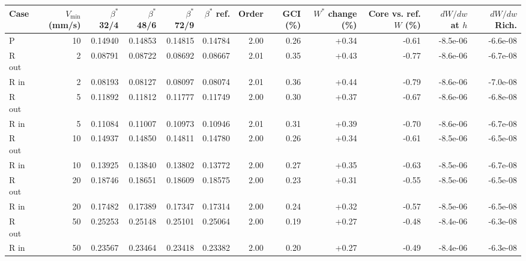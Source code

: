 \begin{tabular}{lrrrrrrrrrrr}
\toprule
Case & $V_\mathrm{min}$ (mm/s) & $\beta^*$ 32/4 & $\beta^*$ 48/6 & $\beta^*$ 72/9 & $\beta^*$ ref. & Order & GCI (\%) & $W^*$ change (\%) & Core vs. ref. $W$ (\%) & $dW/dw$ at $h$ & $dW/dw$ Rich. \\
\midrule
P & 10 & 0.14940 & 0.14853 & 0.14815 & 0.14784 & 2.00 & 0.26 & +0.34 & -0.61 & -8.5e-06 & -6.6e-08 \\
R out & 2 & 0.08791 & 0.08722 & 0.08692 & 0.08667 & 2.01 & 0.35 & +0.43 & -0.77 & -8.6e-06 & -6.7e-08 \\
R in & 2 & 0.08193 & 0.08127 & 0.08097 & 0.08074 & 2.01 & 0.36 & +0.44 & -0.79 & -8.6e-06 & -7.0e-08 \\
R out & 5 & 0.11892 & 0.11812 & 0.11777 & 0.11749 & 2.00 & 0.30 & +0.37 & -0.67 & -8.6e-06 & -6.8e-08 \\
R in & 5 & 0.11084 & 0.11007 & 0.10973 & 0.10946 & 2.01 & 0.31 & +0.39 & -0.70 & -8.6e-06 & -6.7e-08 \\
R out & 10 & 0.14937 & 0.14850 & 0.14811 & 0.14780 & 2.00 & 0.26 & +0.34 & -0.61 & -8.5e-06 & -6.5e-08 \\
R in & 10 & 0.13925 & 0.13840 & 0.13802 & 0.13772 & 2.00 & 0.27 & +0.35 & -0.63 & -8.5e-06 & -6.7e-08 \\
R out & 20 & 0.18746 & 0.18651 & 0.18609 & 0.18575 & 2.00 & 0.23 & +0.31 & -0.55 & -8.5e-06 & -6.5e-08 \\
R in & 20 & 0.17482 & 0.17389 & 0.17347 & 0.17314 & 2.00 & 0.24 & +0.32 & -0.57 & -8.5e-06 & -6.5e-08 \\
R out & 50 & 0.25253 & 0.25148 & 0.25101 & 0.25064 & 2.00 & 0.19 & +0.27 & -0.48 & -8.4e-06 & -6.3e-08 \\
R in & 50 & 0.23567 & 0.23464 & 0.23418 & 0.23382 & 2.00 & 0.20 & +0.27 & -0.49 & -8.4e-06 & -6.3e-08 \\
\bottomrule
\end{tabular}
